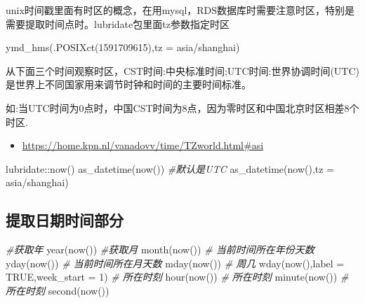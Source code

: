 \documentclass[
]{book}
\newenvironment{Shaded}{\begin{snugshade}}{\end{snugshade}}
\newcommand{\AttributeTok}[1]{\textcolor[rgb]{0.77,0.63,0.00}{#1}}
\newcommand{\CommentTok}[1]{\textcolor[rgb]{0.56,0.35,0.01}{\textit{#1}}}
\newcommand{\ConstantTok}[1]{\textcolor[rgb]{0.00,0.00,0.00}{#1}}
\newcommand{\DecValTok}[1]{\textcolor[rgb]{0.00,0.00,0.81}{#1}}
\newcommand{\FunctionTok}[1]{\textcolor[rgb]{0.00,0.00,0.00}{#1}}
\newcommand{\NormalTok}[1]{#1}
\newcommand{\SpecialCharTok}[1]{\textcolor[rgb]{0.00,0.00,0.00}{#1}}
\newcommand{\StringTok}[1]{\textcolor[rgb]{0.31,0.60,0.02}{#1}}
\providecommand{\tightlist}{%
  \setlength{\itemsep}{0pt}\setlength{\parskip}{0pt}}
\begin{document}
unix时间戳里面有时区的概念，在用mysql，RDS数据库时需要注意时区，特别是需要提取时间点时。lubridate包里面tz参数指定时区

\begin{Shaded}
\begin{Highlighting}[]
\FunctionTok{ymd\_hms}\NormalTok{(}\FunctionTok{.POSIXct}\NormalTok{(}\DecValTok{1591709615}\NormalTok{),}\AttributeTok{tz =} \StringTok{\textquotesingle{}asia/shanghai\textquotesingle{}}\NormalTok{)}
\end{Highlighting}
\end{Shaded}

从下面三个时间观察时区，CST时间:中央标准时间;UTC时间:世界协调时间(UTC)是世界上不同国家用来调节时钟和时间的主要时间标准。

如:当UTC时间为0点时，中国CST时间为8点，因为零时区和中国北京时区相差8个时区.

\begin{itemize}
\tightlist
\item
  \url{https://home.kpn.nl/vanadovv/time/TZworld.html\#asi}
\end{itemize}

\begin{Shaded}
\begin{Highlighting}[]
\NormalTok{lubridate}\SpecialCharTok{::}\FunctionTok{now}\NormalTok{()}
\FunctionTok{as\_datetime}\NormalTok{(}\FunctionTok{now}\NormalTok{()) }\CommentTok{\#默认是UTC}
\FunctionTok{as\_datetime}\NormalTok{(}\FunctionTok{now}\NormalTok{(),}\AttributeTok{tz =} \StringTok{\textquotesingle{}asia/shanghai\textquotesingle{}}\NormalTok{)}
\end{Highlighting}
\end{Shaded}

\hypertarget{lubridate:extracting-information}{%
\subsection{提取日期时间部分}\label{lubridate:extracting-information}}

\begin{Shaded}
\begin{Highlighting}[]
\CommentTok{\#获取年}
\FunctionTok{year}\NormalTok{(}\FunctionTok{now}\NormalTok{())  }
\CommentTok{\#获取月}
\FunctionTok{month}\NormalTok{(}\FunctionTok{now}\NormalTok{())}
\CommentTok{\# 当前时间所在年份天数}
\FunctionTok{yday}\NormalTok{(}\FunctionTok{now}\NormalTok{())}
\CommentTok{\# 当前时间所在月天数}
\FunctionTok{mday}\NormalTok{(}\FunctionTok{now}\NormalTok{())}
\CommentTok{\# 周几}
\FunctionTok{wday}\NormalTok{(}\FunctionTok{now}\NormalTok{(),}\AttributeTok{label =} \ConstantTok{TRUE}\NormalTok{,}\AttributeTok{week\_start =} \DecValTok{1}\NormalTok{)}
\CommentTok{\# 所在时刻}
\FunctionTok{hour}\NormalTok{(}\FunctionTok{now}\NormalTok{())}
\CommentTok{\# 所在时刻}
\FunctionTok{minute}\NormalTok{(}\FunctionTok{now}\NormalTok{())}
\CommentTok{\# 所在时刻}
\FunctionTok{second}\NormalTok{(}\FunctionTok{now}\NormalTok{())}
\end{Highlighting}
\end{Shaded}
\end{document}
